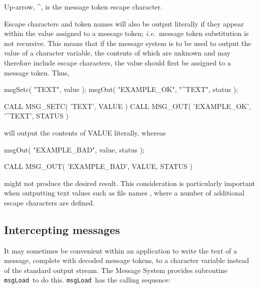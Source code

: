 \documentclass[twoside,11pt]{starlink}
\providecommand{\func}[1]{\texttt{#1}}
\providecommand{\msgload}{\func{msgLoad}}
\begin{document}
\begin {small}
\begin{terminalv}
Up-arrow, ^, is the message token escape character.
\end{terminalv}
\end {small}

Escape characters and token names will also be output literally if they
appear within the value assigned to a message token; \emph{i.e.}\ message token
substitution is not recursive.
This means that if the message system is to be used to output the value of a
character variable, the contents of which are unknown and may therefore
include escape characters, the value should first be assigned to a message
token.
Thus,

\begin {small}
\begin{terminalv}
msgSetc( "TEXT", value );
msgOut( "EXAMPLE_OK", "^TEXT", status );

CALL MSG_SETC( 'TEXT', VALUE )
CALL MSG_OUT( 'EXAMPLE_OK', '^TEXT', STATUS )
\end{terminalv}
\end {small}

will output the contents of VALUE literally, whereas

\begin {small}
\begin{terminalv}
msgOut( "EXAMPLE_BAD", value, status );

CALL MSG_OUT( 'EXAMPLE_BAD', VALUE, STATUS )
\end{terminalv}
\end {small}

might not produce the desired result.
This consideration is particularly important when outputting text values
such as file names
,
where a number of additional escape characters are
defined.


\subsection{Intercepting messages \label{inter_sect}}

It may sometimes be convenient within an application to write the text of a
message, complete with decoded message tokens, to a character variable
instead of the standard output stream.
The Message System provides subroutine \msgload\ to do this.
\msgload\ has the calling sequence:
\end{document}
